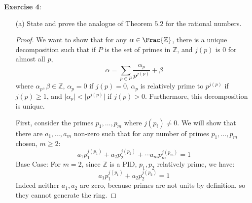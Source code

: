 \documentclass{article}
\begin{document}
\textbf{Exercise 4}: 
    \begin{itemize}
        \item [(a)] State and prove the analogue of Theorem $5.2$ for the rational numbers.
            \begin{proof}
                We want to show that for any $\alpha \in \Frac{\mathbb{Z}}$, there is a unique decomposition such that if $P$ is the set of primes in $\mathbb{Z}$, and $j(p)$ is $0$ for almost all $p$,
                    \begin{equation*}
                        \alpha = \sum_{p \in P}\dfrac{\alpha_{p}}{p^{j(p)}} + \beta
                    \end{equation*}
                where $\alpha_{p}, \beta \in \mathbb{Z}$, $\alpha_{p} = 0$ if $j(p) = 0$, $\alpha_{p}$ is relatively prime to $p^{j(p)}$ if $j(p) \geq 1$, and $\lvert \alpha_{p} \rvert < \lvert p^{j(p)} \rvert$ if $j(p) > 0$. Furthermore, this decomposition is unique.

                First, consider the primes $p_{1}, \ldots , p_{m}$ where $j(p_{i}) \neq 0$. We will show that there are $a_{1}, \ldots , a_{m}$ non-zero such that for any number of primes $p_{1}, \ldots , p_{m}$ chosen, $m \geq 2$:
                    \begin{equation*}
                        a_{1}p_{1}^{j(p_{1})} + a_{2}p_{2}^{j(p_{2})} + \cdots a_{m}p_{m}^{j(p_{m})} = 1
                    \end{equation*}
                Base Case: For $m = 2$, since $\mathbb{Z}$ is a PID, $p_{1}, p_{2}$ relatively prime, we have:
                    \begin{equation*}
                        a_{1}p_{1}^{j(p_{1})} + a_{2}p_{2}^{j(p_{2})} = 1
                    \end{equation*}
                Indeed neither $a_{1}, a_{2}$ are zero, because primes are not units by definition, so they cannot generate the ring.


\end{proof}
\end{itemize}
\end{document}
